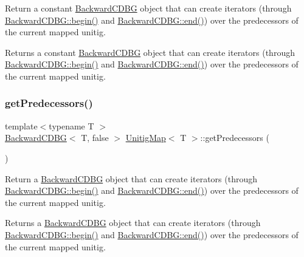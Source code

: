 Return a constant \hyperlink{classBackwardCDBG}{Backward\+C\+D\+BG} object that can create iterators (through \hyperlink{classBackwardCDBG_ae7da438db925caebd02493ac7b1c01ab}{Backward\+C\+D\+B\+G\+::begin()} and \hyperlink{classBackwardCDBG_a898f45d400da7b0153644b5417b07657}{Backward\+C\+D\+B\+G\+::end()}) over the predecessors of the current mapped unitig. 

\begin{DoxyReturn}{Returns}
a constant \hyperlink{classBackwardCDBG}{Backward\+C\+D\+BG} object that can create iterators (through \hyperlink{classBackwardCDBG_ae7da438db925caebd02493ac7b1c01ab}{Backward\+C\+D\+B\+G\+::begin()} and \hyperlink{classBackwardCDBG_a898f45d400da7b0153644b5417b07657}{Backward\+C\+D\+B\+G\+::end()}) over the predecessors of the current mapped unitig. 
\end{DoxyReturn}
\mbox{\label{structUnitigMap_af2bb9574c7a55bb0e8a564e89a1aa7c6}} 
\subsubsection{\texorpdfstring{get\+Predecessors()}{getPredecessors()}\hspace{0.1cm}{\footnotesize\ttfamily [2/2]}}
{\footnotesize\ttfamily template$<$typename T $>$ \\
\hyperlink{classBackwardCDBG}{Backward\+C\+D\+BG}$<$ T, false $>$ \hyperlink{structUnitigMap}{Unitig\+Map}$<$ T $>$\+::get\+Predecessors (\begin{DoxyParamCaption}{ }\end{DoxyParamCaption})}



Return a \hyperlink{classBackwardCDBG}{Backward\+C\+D\+BG} object that can create iterators (through \hyperlink{classBackwardCDBG_ae7da438db925caebd02493ac7b1c01ab}{Backward\+C\+D\+B\+G\+::begin()} and \hyperlink{classBackwardCDBG_a898f45d400da7b0153644b5417b07657}{Backward\+C\+D\+B\+G\+::end()}) over the predecessors of the current mapped unitig. 

\begin{DoxyReturn}{Returns}
a \hyperlink{classBackwardCDBG}{Backward\+C\+D\+BG} object that can create iterators (through \hyperlink{classBackwardCDBG_ae7da438db925caebd02493ac7b1c01ab}{Backward\+C\+D\+B\+G\+::begin()} and \hyperlink{classBackwardCDBG_a898f45d400da7b0153644b5417b07657}{Backward\+C\+D\+B\+G\+::end()}) over the predecessors of the current mapped unitig. 
\end{DoxyReturn}
\mbox{\label{structUnitigMap_a88005a00159b310711230733e16e2ae7}} 
